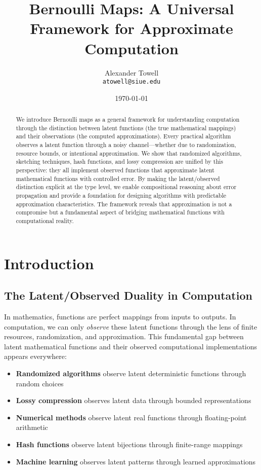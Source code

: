 \documentclass[11pt,final,hidelinks]{article}
\title{Bernoulli Maps: A Universal Framework for Approximate Computation}
\author{
    Alexander Towell\\
    \texttt{atowell@siue.edu}
}
\date{\today}
\begin{document}
\maketitle
\NotationSection

\begin{abstract}
We introduce Bernoulli maps as a general framework for understanding computation through the distinction between latent functions (the true mathematical mappings) and their observations (the computed approximations). Every practical algorithm observes a latent function through a noisy channel—whether due to randomization, resource bounds, or intentional approximation. We show that randomized algorithms, sketching techniques, hash functions, and lossy compression are unified by this perspective: they all implement observed functions that approximate latent mathematical functions with controlled error. By making the latent/observed distinction explicit at the type level, we enable compositional reasoning about error propagation and provide a foundation for designing algorithms with predictable approximation characteristics. The framework reveals that approximation is not a compromise but a fundamental aspect of bridging mathematical functions with computational reality.
\end{abstract}

\section{Introduction}

\subsection{The Latent/Observed Duality in Computation}

In mathematics, functions are perfect mappings from inputs to outputs. In computation, we can only \emph{observe} these latent functions through the lens of finite resources, randomization, and approximation. This fundamental gap between latent mathematical functions and their observed computational implementations appears everywhere:

\begin{itemize}
    \item \textbf{Randomized algorithms} observe latent deterministic functions through random choices
    \item \textbf{Lossy compression} observes latent data through bounded representations
    \item \textbf{Numerical methods} observe latent real functions through floating-point arithmetic
    \item \textbf{Hash functions} observe latent bijections through finite-range mappings
    \item \textbf{Machine learning} observes latent patterns through learned approximations
\end{itemize}
\end{document}
